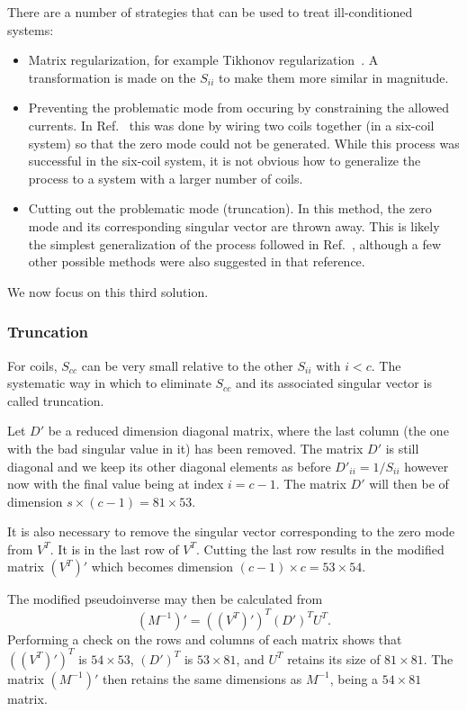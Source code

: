 \documentclass[preprint,12pt]{elsarticle}
\begin{document}
There are a number of strategies that can be used to treat
ill-conditioned systems:
\begin{itemize}
  \item Matrix regularization, for example Tikhonov
    regularization~\cite{bib:franke}.  A transformation is made on the
    $S_{ii}$ to make them more similar in magnitude.
  \item Preventing the problematic mode from occuring by constraining
    the allowed currents.  In Ref.~\cite{bib:shomithesis} this was
    done by wiring two coils together (in a six-coil system) so that
    the zero mode could not be generated.  While this process was
    successful in the six-coil system, it is not obvious how to
    generalize the process to a system with a larger number of coils.
  \item Cutting out the problematic mode (truncation).  In this
    method, the zero mode and its corresponding singular vector are
    thrown away.  This is likely the simplest generalization of the
    process followed in Ref.~\cite{bib:shomithesis}, although a few
    other possible methods were also suggested in that reference.
\end{itemize}
We now focus on this third solution.

\subsubsection{Truncation}

For coils, $S_{cc}$ can be very small relative to the other $S_{ii}$
with $i<c$.  The systematic way in which to eliminate $S_{cc}$ and its
associated singular vector is called truncation.

Let $D'$ be a reduced dimension diagonal matrix, where the last column
(the one with the bad singular value in it) has been removed.  The
matrix $D'$ is still diagonal and we keep its other diagonal elements
as before $D'_{ii}=1/S_{ii}$ however now with the final value being at
index $i=c-1$.  The matrix $D'$ will then be of dimension
$s\times(c-1)=81\times 53$.

It is also necessary to remove the singular vector corresponding to
the zero mode from $V^T$.  It is in the last row of $V^T$.  Cutting
the last row results in the modified matrix $(V^T)'$ which becomes
dimension $(c-1)\times c=53\times 54$.

The modified pseudoinverse may then be calculated from
\begin{equation}
  (M^{-1})'=((V^T)')^T(D')^TU^T.
\end{equation}
Performing a check on the rows and columns of each matrix shows that
$((V^T)')^T$ is $54\times 53$, $(D')^T$ is $53\times 81$, and $U^T$
retains its size of $81\times 81$.  The matrix $(M^{-1})'$ then retains
the same dimensions as $M^{-1}$, being a $54\times 81$ matrix.
\end{document}
